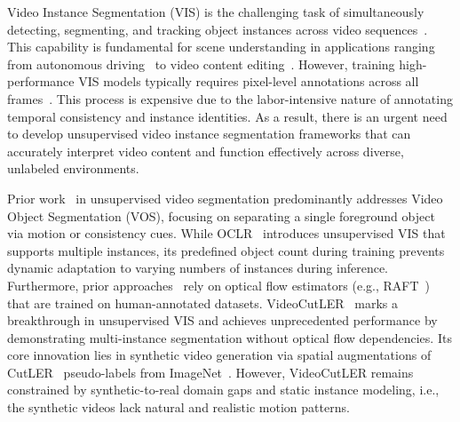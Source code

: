 Video Instance Segmentation (VIS) is the challenging task of simultaneously detecting, segmenting, and tracking object instances across video sequences~\cite{ytvis2019,wu2022seqformer,lin2020video,heo2022vita,wang2021end,zhang2023dvis}. This capability is fundamental for scene understanding in applications ranging from autonomous driving~\cite{driving_vis_dataset} to video content editing~\cite{vis_survey}. However, training high-performance VIS models typically requires pixel-level annotations across all frames~\cite{ytvis2019}. This process is expensive due to the labor-intensive nature of annotating temporal consistency and instance identities. As a result, there is an urgent need to develop unsupervised video instance segmentation frameworks that can accurately interpret video content and function effectively across diverse, unlabeled environments.

Prior work~\cite{motiongroup, emdriven, guessmove, bootstrapping, highly_probable_positive_features, transport_network, dense_video_seg} in unsupervised video segmentation predominantly addresses Video Object Segmentation (VOS), focusing on separating a single foreground object via motion or consistency cues. While OCLR~\cite{oclr} introduces unsupervised VIS that supports multiple instances, its predefined object count during training prevents dynamic adaptation to varying numbers of instances during inference. Furthermore, prior approaches~\cite{motiongroup, emdriven, guessmove, bootstrapping, oclr} rely on optical flow estimators (e.g.,  RAFT~\cite{raft}) that are trained on human-annotated datasets. VideoCutLER~\cite{videocutler} marks a breakthrough in unsupervised VIS and achieves unprecedented performance by demonstrating multi-instance segmentation without optical flow dependencies. Its core innovation lies in synthetic video generation via spatial augmentations of CutLER~\cite{cutler} pseudo-labels from ImageNet~\cite{imagenet}. However, VideoCutLER remains constrained by synthetic-to-real domain gaps and static instance modeling, i.e., the synthetic videos lack natural and realistic motion patterns. 

